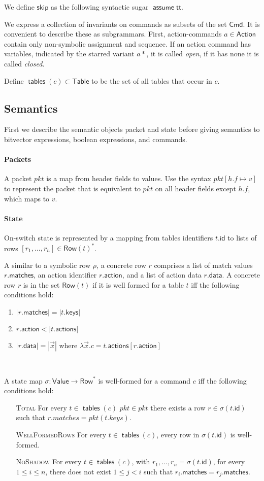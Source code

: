 \documentclass{article}
\newcommand{\pkt}{\mathit{pkt}}
\newcommand{\TRUE}{\mathsf{tt}}
\newcommand{\Value}{\mathsf{Value}}
\newcommand{\Cmd}{\mathsf{Cmd}}
\newcommand{\Action}{\mathsf{Action}}
\newcommand{\Table}{\mathsf{Table}}
\newcommand{\Row}{\mathsf{Row}}
\newcommand{\matches}{\mathsf{matches}}
\newcommand{\action}{\mathsf{action}}
\newcommand{\actions}{\mathsf{actions}}
\newcommand{\keys}{\mathsf{keys}}
\newcommand{\data}{\mathsf{data}}
\newcommand{\id}{\mathsf{id}}
\newcommand{\assume}{\mathop{\mathsf{assume}}}
\newcommand{\SKIP}{\mathsf{skip}}
\newcommand{\tables}{\mathop{\mathsf{tables}}}
\begin{document}
We define $\SKIP$ as the following syntactic sugar $\assume \TRUE$.

We express a collection of invariants on commands as subsets of the set $\Cmd$.
It is convenient to describe these as subgrammars. First, action-commands $a \in
\Action$ contain only non-symbolic assignment and sequence. If an action
command has variables, indicated by the starred variant $a*$, it is called
\emph{open}, if it has none it is called \emph{closed}.

Define $\tables(c) \subset \Table$ to be the set of all tables that occur in $c$.

\subsection{Semantics}

First we describe the semantic objects packet and state before giving semantics
to bitvector expressions, boolean expressions, and commands.

\paragraph{Packets}
A packet $\pkt$ is a map from header fields to values. Use the syntax $\pkt[h.f
  \mapsto v]$ to represent the packet that is equivalent to $\pkt$ on all header
fields except $h.f$, which maps to $v$.

\paragraph{State}
On-switch state is represented by a mapping from tables identifiers $t.\id$ to
lists of rows $[r_1,\ldots,r_n] \in \Row(t)^*$.

A similar to a symbolic row $\rho$, a concrete row $r$ comprises a list of match
values $r.\matches$, an action identifier $r.\action$, and a list of action data
$r.\data$. A concrete row $r$ is in the set $\Row(t)$ if it is well formed for a
table $t$ iff the following conditions hold:
\begin{enumerate}
\item $|r.\matches| = |t.\keys|$
\item $r.\action < |t.\actions|$
\item $|r.\data| = |\vec x|$ where $\lambda \vec x. c = t.\actions[r.\action]$
\end{enumerate}\

A state map $\sigma : \Value \to \Row^*$ is well-formed for a command $c$ iff the
following conditions hold:
\begin{enumerate}
\item[\textsc{Total}] For every $t \in \tables(c)$ $\pkt \in \pkt$ there exists a row $r \in \sigma(t.\id)$ such that $r.matches = \pkt(t.keys)$.
\item[\textsc{WellFormedRows}] For every $t\in \tables(c)$, every row in $\sigma(t.\id)$ is well-formed.
\item[\textsc{NoShadow}] For every $t \in \tables(c)$, with $r_1,\ldots,r_n =
  \sigma(t.\id)$, for every $1 \leq i \leq n$, there does not exist $1 \leq j <
  i$ such that $r_i.\matches = r_j.\matches$.
\end{enumerate}
\end{document}
